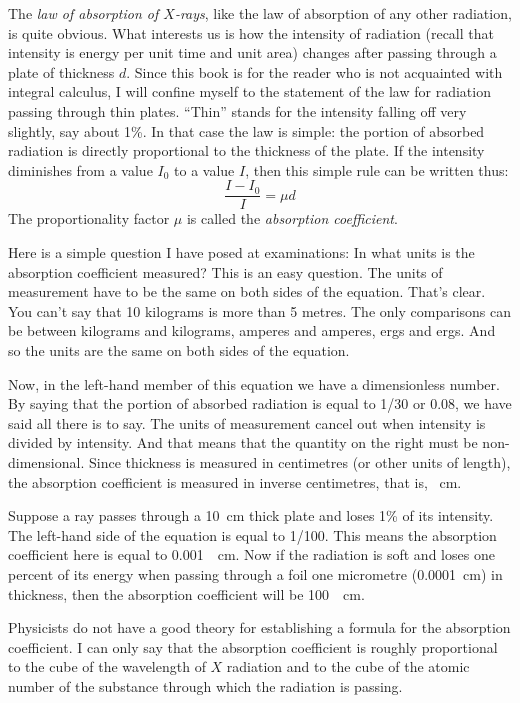 The \emph{law of absorption of $X$-rays}, like the law of absorp­tion of any other radiation, is quite obvious. What in­terests us is how the intensity of radiation (recall that intensity is energy per unit time and unit area) changes after passing through a plate of thickness $d$. Since this book is for the reader who is not acquainted with integral calculus, I will confine myself to the statement of the law for radiation passing through thin plates. ``Thin'' stands for the intensity falling off very slightly, say about 1\%. In that case the law is simple: the portion of absorbed radiation is directly proportional to the thickness of the plate. If the intensity diminishes from a value $I_{0}$ to a value $I$, then this simple rule can be written thus:
\begin{equation*}%
\frac{I - I_{0}}{I} = \mu d
\end{equation*}
The proportionality factor $\mu$ is called the \emph{absorption coefficient}.

Here is a simple question I have posed at examinations: In what units is the absorption coefficient measured? This is an easy question. The units of measurement have to be the same on both sides of the equation. That's clear. You can't say that 10 kilograms is more than 5 me­tres. The only comparisons can be between kilograms and kilograms, amperes and amperes, ergs and ergs. And so the units are the same on both sides of the equation.

Now, in the left-hand member of this equation we have a dimensionless number. By saying that the portion of absorbed radiation is equal to 1/30 or 0.08, we have said all there is to say. The units of measurement cancel out when intensity is divided by intensity. And that means that the quantity on the right must be non-dimensional. Since thickness is measured in centimetres (or other units of length), the absorption coefficient is measured in inverse centimetres, that is, \si{\per\centi\meter}.

Suppose a ray passes through a \SI{10}{\centi\meter} thick plate and loses 1\% of its intensity. The left-hand side of the equa­tion is equal to 1/100. This means the absorption coeffic­ient here is equal to \SI{0.001}{\per\centi\meter}. Now if the radiation is soft and loses one percent of its energy when passing through a foil one micrometre (\SI{0.0001}{\centi\meter}) in thickness, then the absorption coefficient will be \SI{100}{\per\centi\meter}.

Physicists do not have a good theory for establishing a formula for the absorption coefficient. I can only say that the absorption coefficient is roughly proportional to the cube of the wavelength of $X$ radiation and to the cube of the atomic number of the substance through which the radiation is passing.

